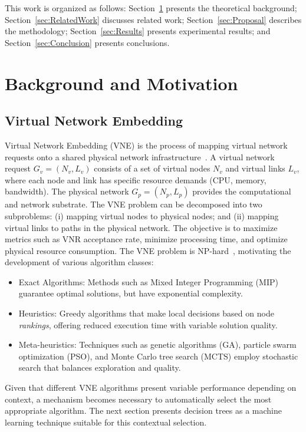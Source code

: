 \documentclass[a4paper,twoside]{article}
\begin{document}
This work is organized as follows: Section~\ref{sec:RefTeo} presents the theoretical background; Section~\ref{sec:RelatedWork} discusses related work; Section~\ref{sec:Proposal} describes the methodology; Section~\ref{sec:Results} presents experimental results; and Section~\ref{sec:Conclusion} presents conclusions.

\section{Background and Motivation}
\label{sec:RefTeo}

\subsection{Virtual Network Embedding}
\label{subsec:vne}

Virtual Network Embedding (VNE) is the process of mapping virtual network requests onto a shared physical network infrastructure~\cite{fischer2013vne-survey}.
A virtual network request $G_v = (N_v, L_v)$ consists of a set of virtual nodes $N_v$ and virtual links $L_v$, where each node and link has specific resource demands (CPU, memory, bandwidth).
The physical network $G_p = (N_p, L_p)$ provides the computational and network substrate.
%
The VNE problem can be decomposed into two subproblems: (i) mapping virtual nodes to physical nodes; and (ii) mapping virtual links to paths in the physical network. The objective is to maximize metrics such as VNR acceptance rate, minimize processing time, and optimize physical resource consumption.
%
The VNE problem is NP-hard~\cite{fischer2013vne-survey}, motivating the development of various algorithm classes:

\begin{itemize}
    \item Exact Algorithms: Methods such as Mixed Integer Programming (MIP) guarantee optimal solutions, but have exponential complexity.
    \item Heuristics: Greedy algorithms that make local decisions based on node \textit{rankings}, offering reduced execution time with variable solution quality.
    \item Meta-heuristics: Techniques such as genetic algorithms (GA), particle swarm optimization (PSO), and Monte Carlo tree search (MCTS) employ stochastic search that balances exploration and quality.
\end{itemize}

Given that different VNE algorithms present variable performance depending on context, a mechanism becomes necessary to automatically select the most appropriate algorithm. The next section presents decision trees as a machine learning technique suitable for this contextual selection.
\end{document}
